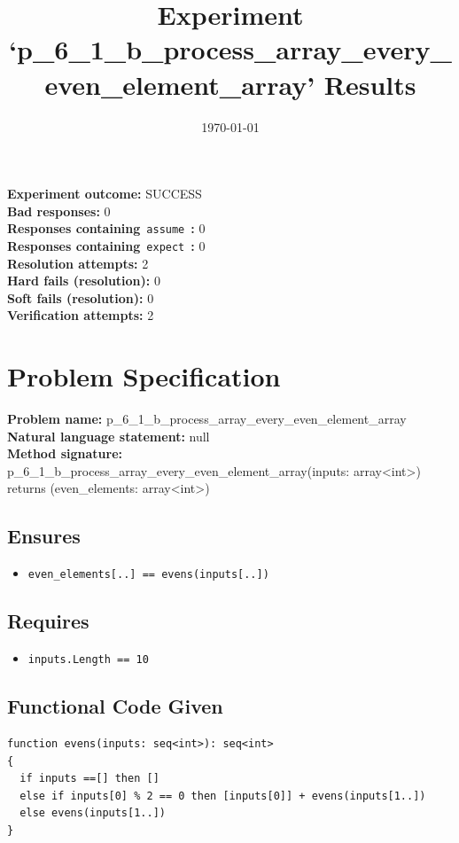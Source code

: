 \documentclass{article}
\begin{document}
\title{Experiment `p\_6\_1\_b\_process\_array\_every\_even\_element\_array' Results}
\author{\today}
\date{}
\maketitle
\textbf{Experiment outcome: }SUCCESS
\\\textbf{Bad responses: }0
\\\textbf{Responses containing}~\texttt{assume}~\textbf{: }0
\\\textbf{Responses containing}~\texttt{expect}~\textbf{: }0
\\\textbf{Resolution attempts: }2
\\\textbf{Hard fails (resolution): }0
\\\textbf{Soft fails (resolution): }0
\\\textbf{Verification attempts: }2
\section*{Problem Specification}
\textbf{Problem name: }p\_6\_1\_b\_process\_array\_every\_even\_element\_array
\\\textbf{Natural language statement: }null
\\\textbf{Method signature: }p\_6\_1\_b\_process\_array\_every\_even\_element\_array(inputs: array<int>) returns (even\_elements: array<int>)
\subsection*{Ensures}
\begin{itemize}
\item \texttt{even\_elements[..] == evens(inputs[..])}
\end{itemize}
\subsection*{Requires}
\begin{itemize}
\item \texttt{inputs.Length == 10}
\end{itemize}
\subsection*{Functional Code Given}
\begin{lstlisting}
function evens(inputs: seq<int>): seq<int>
{
  if inputs ==[] then []
  else if inputs[0] % 2 == 0 then [inputs[0]] + evens(inputs[1..])
  else evens(inputs[1..])
}
\end{lstlisting}
\clearpage
\end{document}
